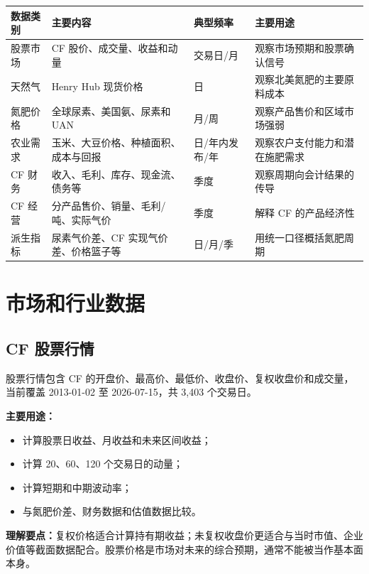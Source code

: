 \documentclass[11pt,a4paper]{ctexart}
\begin{document}
\begin{center}
\small
\begin{tabularx}{\textwidth}{L{2.7cm}L{3.1cm}L{2.1cm}Y}
\toprule
数据类别 & 主要内容 & 典型频率 & 主要用途 \\
\midrule
股票市场 & CF 股价、成交量、收益和动量 & 交易日/月 & 观察市场预期和股票确认信号 \\
天然气 & Henry Hub 现货价格 & 日 & 观察北美氮肥的主要原料成本 \\
氮肥价格 & 全球尿素、美国氨、尿素和 UAN & 月/周 & 观察产品售价和区域市场强弱 \\
农业需求 & 玉米、大豆价格、种植面积、成本与回报 & 日/年内发布/年 & 观察农户支付能力和潜在施肥需求 \\
CF 财务 & 收入、毛利、库存、现金流、债务等 & 季度 & 观察周期向会计结果的传导 \\
CF 经营 & 分产品售价、销量、毛利/吨、实际气价 & 季度 & 解释 CF 的产品经济性 \\
派生指标 & 尿素气价差、CF 实现气价差、价格篮子等 & 日/月/季 & 用统一口径概括氮肥周期 \\
\bottomrule
\end{tabularx}
\normalsize
\end{center}

\section{市场和行业数据}

\subsection{CF 股票行情}

股票行情包含 CF 的开盘价、最高价、最低价、收盘价、复权收盘价和成交量，当前覆盖 2013-01-02 至 2026-07-15，共 3,403 个交易日。

\textbf{主要用途：}

\begin{itemize}
  \item 计算股票日收益、月收益和未来区间收益；
  \item 计算 20、60、120 个交易日的动量；
  \item 计算短期和中期波动率；
  \item 与氮肥价差、财务数据和估值数据比较。
\end{itemize}

\textbf{理解要点：}复权价格适合计算持有期收益；未复权收盘价更适合与当时市值、企业价值等截面数据配合。股票价格是市场对未来的综合预期，通常不能被当作基本面本身。
\end{document}
